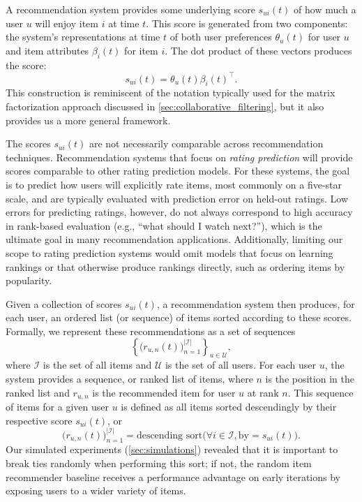 \documentclass[sigconf]{acmart}
\begin{document}
A recommendation system provides some underlying score $s_{ui}(t)$ of how much a user $u$ will enjoy item $i$ at time $t$.  This score is generated from two components: the system's representations at time $t$ of both user preferences $\theta_u(t)$ for user $u$ and item attributes $\beta_i(t)$ for item $i$.  The dot product of these vectors produces the score:
\begin{equation}
s_{ui}(t) = \theta_u(t) \beta_i(t)^\top.
\label{eq:rec_score}
\end{equation}
This construction is reminiscent of the notation typically used for the matrix factorization approach discussed in \cref{sec:collaborative_filtering}, but it also provides us a more general framework.

The scores $s_{ui}(t)$ are not necessarily comparable across recommendation techniques.  Recommendation systems that focus on \emph{rating prediction} will provide scores comparable to other rating prediction models.  For these systems, the goal is to predict how users will explicitly rate items, most commonly on a five-star scale, and are typically evaluated with prediction error on held-out ratings.
Low errors for predicting ratings, however, do not always correspond to high accuracy in rank-based evaluation \citep{cremonesi2010performance,steck2013evaluation} (e.g., ``what should I watch next?''), which is the ultimate goal in many recommendation applications.  Additionally, limiting our scope to rating prediction systems would omit models that focus on learning rankings \citep{karatzoglou2013learning} or that otherwise produce rankings directly, such as ordering items by popularity.

Given a collection of scores $s_{ui}(t)$, a recommendation system then produces, for each user, an ordered list (or sequence) of items sorted according to these scores. Formally, we represent these recommendations as a set of sequences
\begin{equation}
\left\{ \big( r_{u,n}(t) \big)_{n=1}^{|\mathcal{I}|} \right\}_{u\in \mathcal{U}},
\end{equation}
where $\mathcal{I}$ is the set of all items and $\mathcal{U}$ is the set of all users.  For each user $u$, the system provides a sequence, or ranked list of items, where $n$ is the position in the ranked list and $r_{u,n}$ is the recommended item for user $u$ at rank $n$.  This sequence of items for a given user $u$ is defined as all items sorted descendingly by their respective score $s_{ui}(t)$, or
\begin{equation}
\big( r_{u,n}(t) \big)_{n=1}^{|\mathcal{I}|} = \mbox{descending sort} \big( \forall i \in \mathcal{I}, \mbox{by}=s_{ui}(t)\big).
\label{eq:rank}
\end{equation}
Our simulated experiments (\cref{sec:simulations}) revealed that it is important to break ties randomly when performing this sort; if not, the random item recommender baseline receives a performance advantage on early iterations by exposing users to a wider variety of items.
\end{document}
